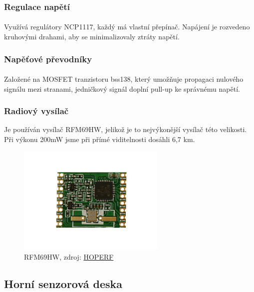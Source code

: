 \documentclass[a4paper]{report}
\begin{document}
\subsubsection{Regulace napětí}
\paragraph{} Využívá regulátory NCP1117, každý má vlastní přepínač. Napájení je rozvedeno kruhovými drahami, aby se minimalizovaly ztráty napětí.
\subsubsection{Napěťové převodníky}
\paragraph{} Založené na MOSFET tranzistoru bss138, který umožňuje propagaci nulového signálu mezi stranami, jedničkový signál doplní pull-up ke správnému napětí.
\subsubsection{Radiový vysílač}
Je používán vysílač RFM69HW, jelikož je to nejvýkonější vysílač této velikosti. Při výkonu 200mW jsme při přímé viditelnosti dosáhli 6,7 km.
\begin{figure}[H]
\caption{RFM69HW, zdroj: \href{http://www.hoperf.com/rf_transceiver/modules/RFM69HW.html}{HOPERF}}
\centering
\includegraphics[width=200pt]{RFM69H.png}
\end{figure}
\subsection{Horní senzorová deska}
\end{document}
